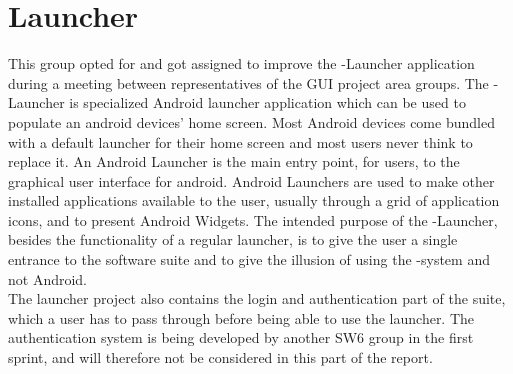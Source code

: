 
\section{Launcher}

This group opted for and got assigned to improve the \giraf-Launcher application during a meeting between representatives of the GUI project area groups.
The \giraf-Launcher is specialized Android launcher application which can be used to populate an android devices' home screen. Most Android devices come bundled with a default launcher for their home screen and most users never think to replace it. An Android Launcher is the main entry point, for users, to the graphical user interface for android. Android Launchers are used to make other installed applications available to the user, usually through a grid of application icons, and to present Android Widgets. The intended purpose of the \giraf-Launcher, besides the functionality of a regular launcher, is to give the user a single entrance to the \giraf software suite and to give the illusion of using the \giraf-system and not Android.\\

The launcher project also contains the login and authentication part of the \giraf suite, which a user has to pass through before being able to use the launcher. The authentication system is being developed by another SW6 group in the first sprint, and will therefore not be considered in this part of the report. 